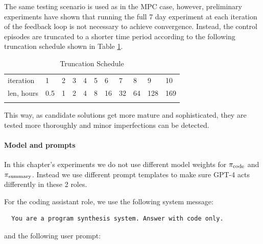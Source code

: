 The same testing scenario is used as in the MPC case, however, preliminary experiments have shown that running the full 7 day experiment at each iteration of the feedback loop is not necessary to achieve convergence. Instead, the control episodes are truncated to a shorter time period according to the following truncation schedule shown in Table \ref{tab:truncation-schedule}.

\begin{table}
\centering
\caption{Truncation Schedule}
\label{tab:truncation-schedule}       %
\begin{tabular}{lllllllllll}
\hline\noalign{\smallskip}
iteration & 1 & 2 & 3 & 4 & 5 & 6 & 7 & 8 & 9 & 10 \\
\noalign{\smallskip}\hline\noalign{\smallskip}
len, hours & 0.5 & 1 & 2 & 4 & 8 & 16 & 32 & 64 & 128 & 169 \\
\noalign{\smallskip}\hline
\end{tabular}
\end{table}

This way, as candidate solutions get more mature and sophisticated, they are tested more thoroughly and minor imperfections can be detected.

\paragraph{Model and prompts} In this chapter's experiments we do not use different model weights for $\pi_\text{code}$ and $\pi_\text{summary}$.
Instead we use different prompt templates to make sure GPT-4 acts differently in these 2 roles.

For the coding assistant role, we use the following system message:

\begin{lstlisting}
  You are a program synthesis system. Answer with code only.
\end{lstlisting}

and the following user prompt:

